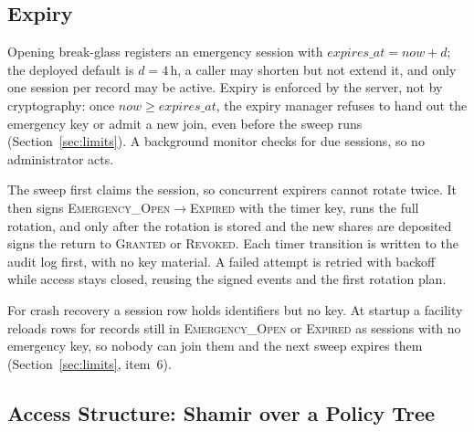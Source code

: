 \subsection{Expiry}\label{sec:lifecycle-expiry}

Opening break-glass registers an emergency session with
$\mathit{expires\_at} = \mathit{now} + d$; the deployed default is
$d = 4$\,h, a caller may shorten but not extend it, and only one session per
record may be active.
Expiry is enforced by the server, not by cryptography: once
$\mathit{now} \ge \mathit{expires\_at}$, the expiry manager refuses to hand out
the emergency key or admit a new join, even before the sweep runs
(Section~\ref{sec:limits}).
A background monitor checks for due sessions, so no administrator acts.

The sweep first claims the session, so concurrent expirers cannot rotate
twice.
It then signs \textsc{Emergency\_Open}$\to$\allowbreak\textsc{Expired} with the timer
key, runs the full rotation, and only after the rotation is stored and the new
shares are deposited signs the return to \textsc{Granted} or
\textsc{Revoked}.
Each timer transition is written to the audit log first, with no key
material.
A failed attempt is retried with backoff while access stays closed, reusing
the signed events and the first rotation plan.

For crash recovery a session row holds identifiers but no key.
At startup a facility reloads rows for records still in
\textsc{Emergency\_Open} or \textsc{Expired} as sessions with no emergency
key, so nobody can join them and the next sweep expires them
(Section~\ref{sec:limits}, item~6).

\subsection{Access Structure: Shamir over a Policy Tree}\label{sec:lifecycle-access}


